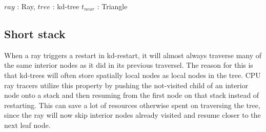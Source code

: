 \begin{algorithm}
  \caption{A kd-restart implementation of ClosestIntersectingTriangle}
  \label{alg:KDRestart}
  \begin{algorithmic}
              {$ray$ : Ray, $tree$ : kd-tree}
              {$t_{near}$ : Triangle}{
                    \ELSE
                    \ENDIF
                  \ENDWHILE
                  \ELSE
                  \ENDIF
                \ENDWHILE
              }
  \end{algorithmic}
\end{algorithm}

\subsection{Short stack}\label{sec:shortStack}


When a ray triggers a restart in kd-restart, it will almost always traverse many
of the same interior nodes as it did in its previous traversel. The reason for
this is that kd-trees will often store spatially local nodes as local nodes in
the tree. CPU ray tracers utilize this property by pushing the not-visited child
of an interior node onto a stack and then resuming from the first node on that
stack instead of restarting. This can save a lot of resources otherwise spent on
traversing the tree, since the ray will now skip interior nodes already visited
and resume closer to the next leaf node.

